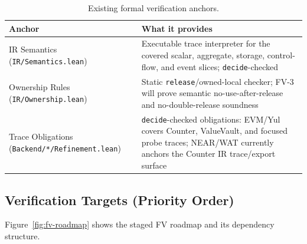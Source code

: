 \documentclass[sigconf]{acmart}
\newcommand{\ttab}{\scriptsize}
\begin{document}
\begin{table}[t]
  \caption{Existing formal verification anchors.}
  \label{tab:fv}
  \centering
  \ttab
  \begin{tabularx}{\textwidth}{l X}
    \toprule
    \bfseries Anchor & \bfseries What it provides \\
    \midrule
    IR Semantics \scriptsize(\texttt{IR/Semantics.lean}) & Executable trace interpreter for the covered scalar, aggregate, storage, control-flow, and event slices; \texttt{decide}-checked \\
    \addlinespace
    Ownership Rules \scriptsize(\texttt{IR/Ownership.lean}) & Static \texttt{release}/owned-local checker; FV-3 will prove semantic no-use-after-release and no-double-release soundness \\
    \addlinespace
    Trace Obligations \scriptsize(\texttt{Backend/*/Refinement.lean}) & \texttt{decide}-checked obligations: EVM/Yul covers Counter, ValueVault, and focused probe traces; NEAR/WAT currently anchors the Counter IR trace/export surface \\
    \bottomrule
  \end{tabularx}
\end{table}

\subsection{Verification Targets (Priority Order)}

Figure~\ref{fig:fv-roadmap} shows the staged FV roadmap and its dependency structure.
\end{document}

